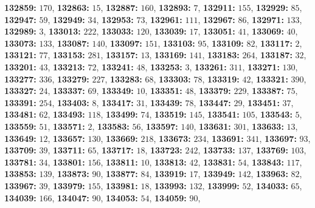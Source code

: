 \textsf{\bfseries 132859:} $170$, \textsf{\bfseries 132863:} $15$, \textsf{\bfseries 132887:} $160$, \textsf{\bfseries 132893:} $7$, \textsf{\bfseries 132911:} $155$, \textsf{\bfseries 132929:} $85$, \textsf{\bfseries 132947:} $59$, \textsf{\bfseries 132949:} $34$, \textsf{\bfseries 132953:} $73$, \textsf{\bfseries 132961:} $111$, \textsf{\bfseries 132967:} $86$, \textsf{\bfseries 132971:} $133$, \textsf{\bfseries 132989:} $3$, \textsf{\bfseries 133013:} $222$, \textsf{\bfseries 133033:} $120$, \textsf{\bfseries 133039:} $17$, \textsf{\bfseries 133051:} $41$, \textsf{\bfseries 133069:} $40$, \textsf{\bfseries 133073:} $133$, \textsf{\bfseries 133087:} $140$, \textsf{\bfseries 133097:} $151$, \textsf{\bfseries 133103:} $95$, \textsf{\bfseries 133109:} $82$, \textsf{\bfseries 133117:} $2$, \textsf{\bfseries 133121:} $77$, \textsf{\bfseries 133153:} $281$, \textsf{\bfseries 133157:} $13$, \textsf{\bfseries 133169:} $141$, \textsf{\bfseries 133183:} $264$, \textsf{\bfseries 133187:} $32$, \textsf{\bfseries 133201:} $43$, \textsf{\bfseries 133213:} $72$, \textsf{\bfseries 133241:} $48$, \textsf{\bfseries 133253:} $3$, \textsf{\bfseries 133261:} $311$, \textsf{\bfseries 133271:} $130$, \textsf{\bfseries 133277:} $336$, \textsf{\bfseries 133279:} $227$, \textsf{\bfseries 133283:} $68$, \textsf{\bfseries 133303:} $78$, \textsf{\bfseries 133319:} $42$, \textsf{\bfseries 133321:} $390$, \textsf{\bfseries 133327:} $24$, \textsf{\bfseries 133337:} $69$, \textsf{\bfseries 133349:} $10$, \textsf{\bfseries 133351:} $48$, \textsf{\bfseries 133379:} $229$, \textsf{\bfseries 133387:} $75$, \textsf{\bfseries 133391:} $254$, \textsf{\bfseries 133403:} $8$, \textsf{\bfseries 133417:} $31$, \textsf{\bfseries 133439:} $78$, \textsf{\bfseries 133447:} $29$, \textsf{\bfseries 133451:} $37$, \textsf{\bfseries 133481:} $62$, \textsf{\bfseries 133493:} $118$, \textsf{\bfseries 133499:} $74$, \textsf{\bfseries 133519:} $145$, \textsf{\bfseries 133541:} $105$, \textsf{\bfseries 133543:} $5$, \textsf{\bfseries 133559:} $51$, \textsf{\bfseries 133571:} $2$, \textsf{\bfseries 133583:} $56$, \textsf{\bfseries 133597:} $140$, \textsf{\bfseries 133631:} $301$, \textsf{\bfseries 133633:} $13$, \textsf{\bfseries 133649:} $12$, \textsf{\bfseries 133657:} $130$, \textsf{\bfseries 133669:} $218$, \textsf{\bfseries 133673:} $234$, \textsf{\bfseries 133691:} $341$, \textsf{\bfseries 133697:} $93$, \textsf{\bfseries 133709:} $39$, \textsf{\bfseries 133711:} $65$, \textsf{\bfseries 133717:} $18$, \textsf{\bfseries 133723:} $242$, \textsf{\bfseries 133733:} $137$, \textsf{\bfseries 133769:} $103$, \textsf{\bfseries 133781:} $34$, \textsf{\bfseries 133801:} $156$, \textsf{\bfseries 133811:} $10$, \textsf{\bfseries 133813:} $42$, \textsf{\bfseries 133831:} $54$, \textsf{\bfseries 133843:} $117$, \textsf{\bfseries 133853:} $139$, \textsf{\bfseries 133873:} $90$, \textsf{\bfseries 133877:} $84$, \textsf{\bfseries 133919:} $17$, \textsf{\bfseries 133949:} $142$, \textsf{\bfseries 133963:} $82$, \textsf{\bfseries 133967:} $39$, \textsf{\bfseries 133979:} $155$, \textsf{\bfseries 133981:} $18$, \textsf{\bfseries 133993:} $132$, \textsf{\bfseries 133999:} $52$, \textsf{\bfseries 134033:} $65$, \textsf{\bfseries 134039:} $166$, \textsf{\bfseries 134047:} $90$, \textsf{\bfseries 134053:} $54$, \textsf{\bfseries 134059:} $90$, 
